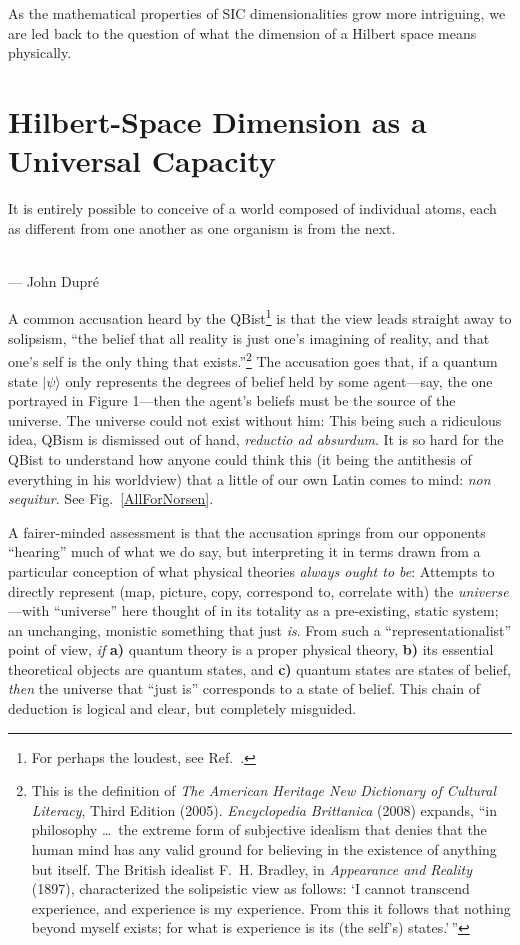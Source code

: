 \documentclass[aps,pra,superscriptaddress,12pt,tightenlines,nofootinbib]{revtex4-2}
\begin{document}
As the mathematical properties of SIC dimensionalities grow more
intriguing, we are led back to the question of what the dimension of a
Hilbert space means physically.

\section{Hilbert-Space Dimension as a Universal Capacity}

\label{HSpaceDim}

\begin{flushright}
\baselineskip=13pt
\parbox{2.8in}{\baselineskip=13pt
\small It is entirely possible to conceive of a world composed of individual atoms, each as different from one another as one organism is from the next.}
\medskip\\
\small --- John Dupr\'e
\end{flushright}

A common accusation heard by the QBist\footnote{For perhaps the loudest, see Ref.\ \cite{Norsen}.} is that the view leads straight away to solipsism, ``the belief that all reality is just one's  imagining of reality, and that one's self is the only thing that exists.''\footnote{This is the definition of {\sl The American Heritage New Dictionary of Cultural Literacy}, Third Edition (2005).  {\sl Encyclopedia Brittanica\/} (2008) expands, ``in philosophy \ldots\ the extreme form of subjective idealism that denies that the human mind has any valid ground for believing in the existence of anything but itself. The British idealist F.~H. Bradley, in {\sl Appearance and Reality\/} (1897), characterized the solipsistic view as follows: `I cannot transcend experience, and experience is my experience. From this it follows that nothing beyond myself exists; for what is experience is its (the self's) states.'$\,$''}  The accusation goes that, if a quantum state $|\psi\rangle$ only represents the degrees of belief held by some agent---say, the one portrayed in Figure 1---then the agent's beliefs must be the source of the universe.  The universe could not exist without him: This being such a ridiculous idea, QBism is dismissed out of hand, {\it reductio ad absurdum}.  It is so hard for the QBist to understand how anyone could think this (it being the antithesis of everything in his worldview) that a little of our own Latin comes to mind: {\it non sequitur}.  See Fig.~\ref{AllForNorsen}.

A fairer-minded assessment is that the accusation springs from our opponents ``hearing'' much of what we do say, but interpreting it in terms drawn from a particular conception of what physical theories {\it always ought to be}:  Attempts to directly represent (map, picture, copy, correspond to, correlate with) the {\it universe}---with ``universe'' here thought of in its totality as a pre-existing, static system; an unchanging, monistic something that just {\it is}.  From such a ``representationalist'' point of view, {\it if\/} {\bf a)} quantum theory is a proper physical theory, {\bf b)} its essential theoretical objects are quantum states, and {\bf c)} quantum states are states of belief, {\it then\/} the universe that ``just is'' corresponds to a state of belief.  This chain of deduction is logical and clear, but completely misguided.
\end{document}

